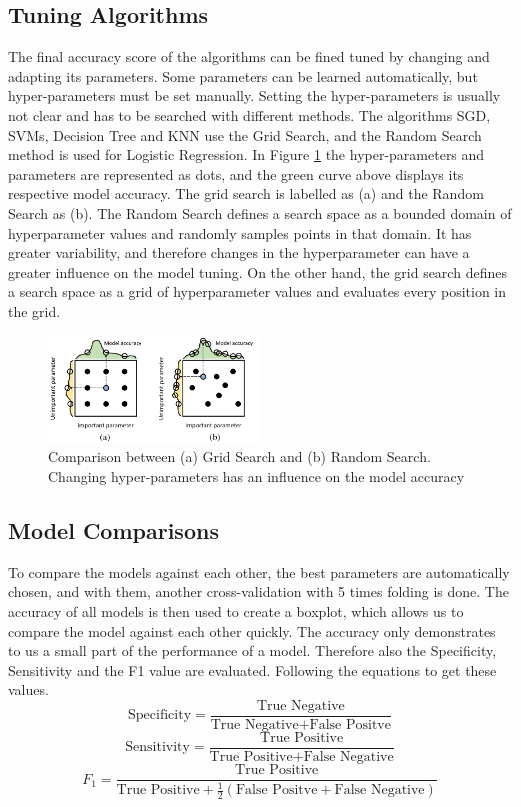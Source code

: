 \documentclass[11pt]{article}
\begin{document}
	\subsection{Tuning Algorithms}
	The final accuracy score of the algorithms can be fined tuned by changing and adapting its parameters. Some parameters can be learned automatically, but hyper-parameters must be set manually. Setting the hyper-parameters is usually not clear and has to be searched with different methods. The algorithms SGD, SVMs, Decision Tree and KNN use the Grid Search, and the Random Search method is used for Logistic Regression. In Figure \ref{fig:tuningAlgos} the hyper-parameters and parameters are represented as dots, and the green curve above displays its respective model accuracy. The grid search is labelled as (a) and the Random Search as (b). The Random Search defines a search space as a bounded domain of hyperparameter values and randomly samples points in that domain. It has greater variability, and therefore changes in the hyperparameter can have a greater influence on the model tuning. On the other hand, the grid search defines a search space as a grid of hyperparameter values and evaluates every position in the grid.
	\begin{figure}[H]
		\centering
		\includegraphics[width=0.5\textwidth]{img/gridsearchAndRandomsearch}
		\caption{Comparison between (a) Grid Search and (b) Random Search. Changing hyper-parameters has an influence on the model accuracy \cite{Pilario}}
		\label{fig:tuningAlgos}
	\end{figure}
	\subsection{Model Comparisons}
	To compare the models against each other, the best parameters are automatically chosen, and with them, another cross-validation with 5 times folding is done.
	The accuracy of all models is then used to create a boxplot, which allows us to compare the model against each other quickly. The accuracy only demonstrates to us a small part of the performance of a model. Therefore also the Specificity, Sensitivity and the F1 value are evaluated. Following the equations to get these values.
	$$ 
	\text{Specificity} = \frac{\text{True Negative}}{\text{True Negative} + \text{False Positve}} $$
	$$
	\text{Sensitivity} = \frac{\text{True Positive}}{\text{True Positive} + \text{False Negative}}
	$$	
	$$
	F_{1}=\frac{\text{True Positive}}{\text{True Positive} + \frac{1}{2}(\text{False Positve} + \text{False Negative})}
	$$
\end{document}
